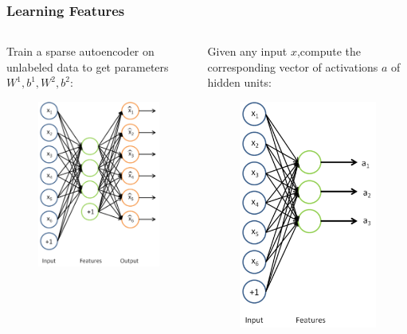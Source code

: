 \documentclass{beamer}
\begin{document}
\begin{CJK*}{UTF8}{gbsn}
\begin{frame}\frametitle{Learning Features}
\begin{columns}
\begin{column}{0.5\linewidth}
Train a sparse autoencoder on unlabeled data to get parameters $W^1,b^1,W^2,b^2$:
\begin{figure}
\centering
\includegraphics[scale=0.5]{images/STL_SparseAE}
\end{figure}
\end{column}
\begin{column}{0.5\linewidth}
Given any input $x$,compute the corresponding vector of activations $a$ of hidden units:
\begin{figure}
\centering
\includegraphics[scale=0.5]{images/STL_SparseAE_Features}

\end{figure}
\end{column}
\end{columns}
\end{frame}
\end{CJK*}
\end{document}
